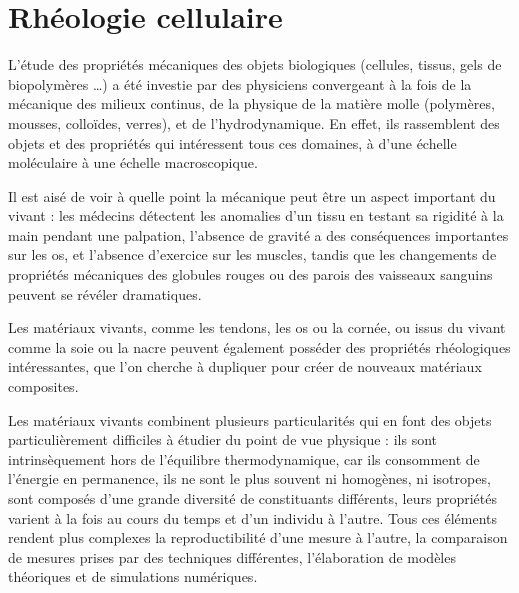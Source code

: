 %
%
%

\chapter{Rhéologie cellulaire}

L'étude des propriétés mécaniques des objets biologiques (cellules, tissus, gels de biopolymères \dots) a été investie par des physiciens convergeant à la fois de la mécanique des milieux continus, de la physique de la matière molle (polymères, mousses, colloïdes, verres), et de l'hydrodynamique. 
En effet, ils rassemblent des objets et des propriétés qui intéressent tous ces domaines, à d'une échelle moléculaire à une échelle macroscopique. 

Il est aisé de voir à quelle point la mécanique peut être un aspect important du vivant : les médecins détectent les anomalies d'un tissu en testant sa rigidité \og à la main \fg pendant une palpation, l'absence de gravité a des conséquences importantes sur les os, et l'absence d'exercice sur les muscles, tandis que les changements de propriétés mécaniques des globules rouges ou des parois des vaisseaux sanguins peuvent se révéler dramatiques. 

Les matériaux vivants, comme les tendons, les os ou la cornée, ou issus du vivant comme la soie ou la nacre peuvent également posséder des propriétés rhéologiques intéressantes, que l'on cherche à dupliquer pour créer de nouveaux matériaux composites. 

Les matériaux vivants combinent plusieurs particularités qui en font des objets particulièrement difficiles à étudier du point de vue physique : ils sont intrinsèquement hors de l'équilibre thermodynamique, car ils consomment de l'énergie en permanence, ils ne sont le plus souvent ni homogènes, ni isotropes, sont composés d'une grande diversité de constituants différents, leurs propriétés varient à la fois au cours du temps et d'un individu à l'autre. 
Tous ces éléments rendent plus complexes la reproductibilité d'une mesure à l'autre, la comparaison de mesures prises par des techniques différentes, l'élaboration de modèles théoriques et de simulations numériques.


